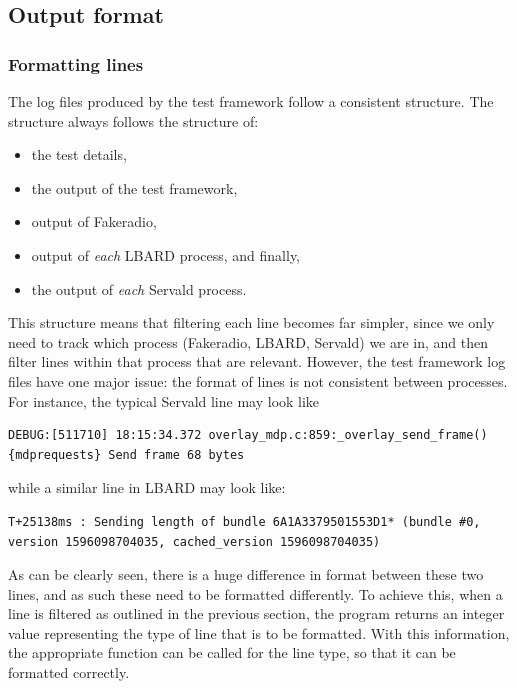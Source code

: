 \subsection{Output format}

\subsubsection{Formatting lines}
The log files produced by the test framework follow a consistent structure.
The structure always follows the structure of:
\begin{itemize}
    \item the test details, 
    \item the output of the test framework, 
    \item output of Fakeradio, 
    \item output of \emph{each} LBARD process, and finally,
    \item the output of \emph{each} Servald process.
\end{itemize} 

This structure means that filtering each line becomes far simpler, since we only need to track which process (Fakeradio, LBARD, Servald) we are in, and then filter lines within that process that are relevant.
However, the test framework log files have one major issue: the format of lines is not consistent between processes.
For instance, the typical Servald line may look like
\begin{center}
    \begin{lstlisting}[basicstyle=\small, breaklines]
DEBUG:[511710] 18:15:34.372 overlay_mdp.c:859:_overlay_send_frame() {mdprequests} Send frame 68 bytes    
    \end{lstlisting}
\end{center}
while a similar line in LBARD may look like:

\begin{center}
    \begin{lstlisting}[basicstyle=\small, breaklines]
T+25138ms : Sending length of bundle 6A1A3379501553D1* (bundle #0, version 1596098704035, cached_version 1596098704035)
    \end{lstlisting}
\end{center}


As can be clearly seen, there is a huge difference in format between these two lines, and as such these need to be formatted differently.
To achieve this, when a line is filtered as outlined in the previous section, the program returns an integer value representing the type of line that is to be formatted.
With this information, the appropriate function can be called for the line type, so that it can be formatted correctly.

